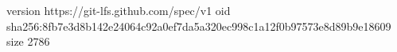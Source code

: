 version https://git-lfs.github.com/spec/v1
oid sha256:8fb7e3d8b142e24064c92a0ef7da5a320ec998c1a12f0b97573e8d89b9e18609
size 2786
